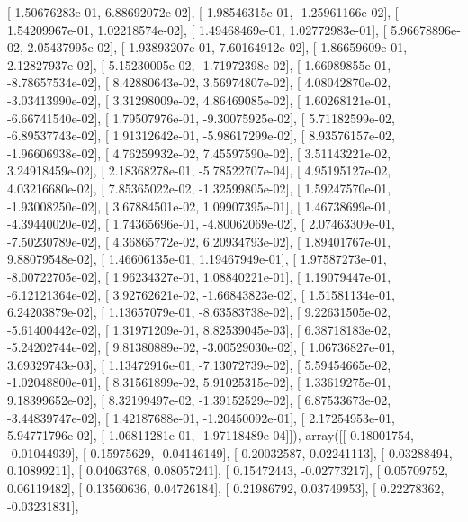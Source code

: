\documentclass{article}
\begin{document}
       [  1.50676283e-01,   6.88692072e-02],
       [  1.98546315e-01,  -1.25961166e-02],
       [  1.54209967e-01,   1.02218574e-02],
       [  1.49468469e-01,   1.02772983e-01],
       [  5.96678896e-02,   2.05437995e-02],
       [  1.93893207e-01,   7.60164912e-02],
       [  1.86659609e-01,   2.12827937e-02],
       [  5.15230005e-02,  -1.71972398e-02],
       [  1.66989855e-01,  -8.78657534e-02],
       [  8.42880643e-02,   3.56974807e-02],
       [  4.08042870e-02,  -3.03413990e-02],
       [  3.31298009e-02,   4.86469085e-02],
       [  1.60268121e-01,  -6.66741540e-02],
       [  1.79507976e-01,  -9.30075925e-02],
       [  5.71182599e-02,  -6.89537743e-02],
       [  1.91312642e-01,  -5.98617299e-02],
       [  8.93576157e-02,  -1.96606938e-02],
       [  4.76259932e-02,   7.45597590e-02],
       [  3.51143221e-02,   3.24918459e-02],
       [  2.18368278e-01,  -5.78522707e-04],
       [  4.95195127e-02,   4.03216680e-02],
       [  7.85365022e-02,  -1.32599805e-02],
       [  1.59247570e-01,  -1.93008250e-02],
       [  3.67884501e-02,   1.09907395e-01],
       [  1.46738699e-01,  -4.39440020e-02],
       [  1.74365696e-01,  -4.80062069e-02],
       [  2.07463309e-01,  -7.50230789e-02],
       [  4.36865772e-02,   6.20934793e-02],
       [  1.89401767e-01,   9.88079548e-02],
       [  1.46606135e-01,   1.19467949e-01],
       [  1.97587273e-01,  -8.00722705e-02],
       [  1.96234327e-01,   1.08840221e-01],
       [  1.19079447e-01,  -6.12121364e-02],
       [  3.92762621e-02,  -1.66843823e-02],
       [  1.51581134e-01,   6.24203879e-02],
       [  1.13657079e-01,  -8.63583738e-02],
       [  9.22631505e-02,  -5.61400442e-02],
       [  1.31971209e-01,   8.82539045e-03],
       [  6.38718183e-02,  -5.24202744e-02],
       [  9.81380889e-02,  -3.00529030e-02],
       [  1.06736827e-01,   3.69329743e-03],
       [  1.13472916e-01,  -7.13072739e-02],
       [  5.59454665e-02,  -1.02048800e-01],
       [  8.31561899e-02,   5.91025315e-02],
       [  1.33619275e-01,   9.18399652e-02],
       [  8.32199497e-02,  -1.39152529e-02],
       [  6.87533673e-02,  -3.44839747e-02],
       [  1.42187688e-01,  -1.20450092e-01],
       [  2.17254953e-01,   5.94771796e-02],
       [  1.06811281e-01,  -1.97118489e-04]]), array([[ 0.18001754, -0.01044939],
       [ 0.15975629, -0.04146149],
       [ 0.20032587,  0.02241113],
       [ 0.03288494,  0.10899211],
       [ 0.04063768,  0.08057241],
       [ 0.15472443, -0.02773217],
       [ 0.05709752,  0.06119482],
       [ 0.13560636,  0.04726184],
       [ 0.21986792,  0.03749953],
       [ 0.22278362, -0.03231831],
\end{document}
